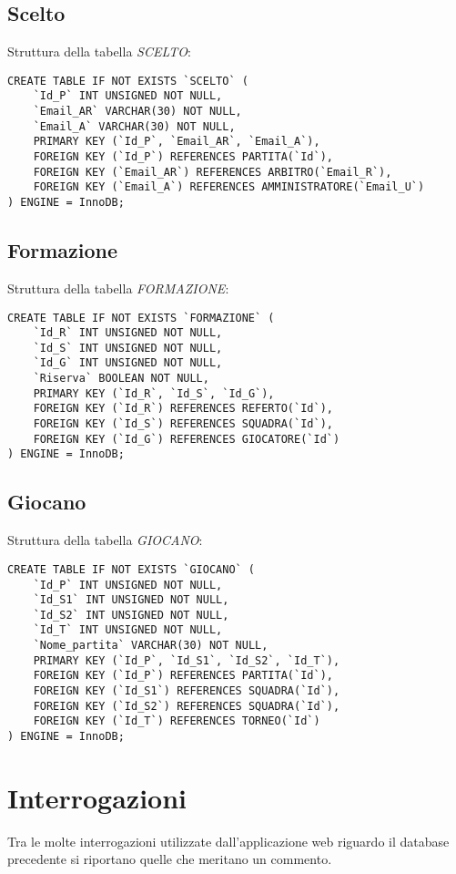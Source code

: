 \newpage

\subsection{Scelto}
Struttura della tabella \emph{SCELTO}:

\begin{lstlisting}
CREATE TABLE IF NOT EXISTS `SCELTO` (
	`Id_P` INT UNSIGNED NOT NULL,
	`Email_AR` VARCHAR(30) NOT NULL,
	`Email_A` VARCHAR(30) NOT NULL,
	PRIMARY KEY (`Id_P`, `Email_AR`, `Email_A`),
	FOREIGN KEY (`Id_P`) REFERENCES PARTITA(`Id`),
	FOREIGN KEY (`Email_AR`) REFERENCES ARBITRO(`Email_R`),
	FOREIGN KEY (`Email_A`) REFERENCES AMMINISTRATORE(`Email_U`)
) ENGINE = InnoDB;
\end{lstlisting}

\subsection{Formazione}
Struttura della tabella \emph{FORMAZIONE}:

\begin{lstlisting}
CREATE TABLE IF NOT EXISTS `FORMAZIONE` (
	`Id_R` INT UNSIGNED NOT NULL,
	`Id_S` INT UNSIGNED NOT NULL,
	`Id_G` INT UNSIGNED NOT NULL,
	`Riserva` BOOLEAN NOT NULL,
	PRIMARY KEY (`Id_R`, `Id_S`, `Id_G`),
	FOREIGN KEY (`Id_R`) REFERENCES REFERTO(`Id`),
	FOREIGN KEY (`Id_S`) REFERENCES SQUADRA(`Id`),
	FOREIGN KEY (`Id_G`) REFERENCES GIOCATORE(`Id`)
) ENGINE = InnoDB;
\end{lstlisting}

\subsection{Giocano}
Struttura della tabella \emph{GIOCANO}:

\begin{lstlisting}
CREATE TABLE IF NOT EXISTS `GIOCANO` (
	`Id_P` INT UNSIGNED NOT NULL,
	`Id_S1` INT UNSIGNED NOT NULL,
	`Id_S2` INT UNSIGNED NOT NULL,
	`Id_T` INT UNSIGNED NOT NULL,
	`Nome_partita` VARCHAR(30) NOT NULL,
	PRIMARY KEY (`Id_P`, `Id_S1`, `Id_S2`, `Id_T`),
	FOREIGN KEY (`Id_P`) REFERENCES PARTITA(`Id`),
	FOREIGN KEY (`Id_S1`) REFERENCES SQUADRA(`Id`),
	FOREIGN KEY (`Id_S2`) REFERENCES SQUADRA(`Id`),
	FOREIGN KEY (`Id_T`) REFERENCES TORNEO(`Id`)
) ENGINE = InnoDB;
\end{lstlisting}

\section{Interrogazioni}
Tra le molte interrogazioni utilizzate dall'applicazione web riguardo il database precedente si riportano quelle che meritano un commento.

